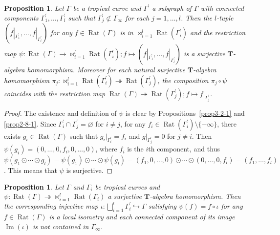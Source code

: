 \documentclass[a4paper,12pt]{amsart}
\newtheorem{prop}[dfn]{Proposition}
\def\Gamma{\varGamma}
\begin{document}
\begin{prop}
    \label{prop3-2-3}
Let $\Gamma$ be a tropical curve and $\Gamma^{\prime}$ a subgraph of $\Gamma$ with connected components $\Gamma^{\prime}_1, \ldots, \Gamma^{\prime}_l$ such that $\Gamma^{\prime}_j \not\subset \Gamma_{\infty}$ for each $j = 1, \ldots, l$.
Then the $l$-tuple $(f|_{\Gamma^{\prime}_1}, \ldots, f|_{\Gamma^{\prime}_l})$ for any $f \in \operatorname{Rat}(\Gamma)$ is in $\bowtie_{i = 1}^l \operatorname{Rat}(\Gamma_i^{\prime})$ and the restriction map $\psi : \operatorname{Rat}(\Gamma) \to \bowtie_{i = 1}^l \operatorname{Rat}(\Gamma_i^{\prime}); f \mapsto (f|_{\Gamma^{\prime}_1}, \ldots, f|_{\Gamma^{\prime}_l})$ is a surjective $\boldsymbol{T}$-algebra homomorphism.
Moreover for each natural surjective $\boldsymbol{T}$-algebra homomorphism $\pi_j : \bowtie_{i = 1}^l \operatorname{Rat}(\Gamma_i^{\prime}) \twoheadrightarrow \operatorname{Rat}(\Gamma_j^{\prime})$, the composition $\pi_j \circ \psi$ coincides with the restriction map $\operatorname{Rat}(\Gamma) \twoheadrightarrow \operatorname{Rat}(\Gamma_j^{\prime}); f \mapsto f|_{\Gamma_j^{\prime}}$.
\end{prop}

\begin{proof}
The existence and definition of $\psi$ is clear by Propositions~\ref{prop3-2-1} and \ref{prop2-8-1}.
Since $\Gamma_i^{\prime} \cap \Gamma^{\prime}_j = \varnothing$ for $i \not= j$, for any $f_i \in \operatorname{Rat}(\Gamma^{\prime}_i) \setminus \{ -\infty \}$, there exists $g_i \in \operatorname{Rat}(\Gamma)$ such that $g_i|_{\Gamma^{\prime}_i} = f_i$ and $g|_{\Gamma^{\prime}_j} = 0$ for $j \not= i$.
Then $\psi(g_i) = (0, \ldots, 0, f_i, 0, \ldots, 0)$, where $f_i$ is the $i$th component, and thus $\psi(g_1 \odot \cdots \odot g_l) = \psi(g_1) \odot \cdots \odot \psi(g_l) = (f_1, 0, \ldots, 0) \odot \cdots \odot (0, \ldots, 0, f_l) = (f_1, \ldots, f_l)$.
This means that $\psi$ is surjective.
\end{proof}

\begin{prop}
    \label{prop3-2-4}
Let $\Gamma$ and $\Gamma_i$ be tropical curves and $\psi : \operatorname{Rat}(\Gamma) \twoheadrightarrow \bowtie_{i = 1}^l \operatorname{Rat}(\Gamma_i)$ a surjective $\boldsymbol{T}$-algebra homomorphism.
Then the corresponding injective map $\iota : \bigsqcup_{i = 1}^l \Gamma_i^{\prime} \hookrightarrow \Gamma$ satisfying $\psi(f) = f \circ \iota$ for any $f \in \operatorname{Rat}(\Gamma)$ is a local isometry and each connected component of its image $\operatorname{Im}(\iota)$ is not contained in $\Gamma_{\infty}$.
\end{prop}
\end{document}
